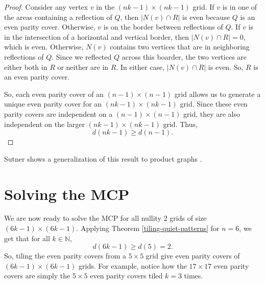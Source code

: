 \documentclass[a4paper]{article}
\newcommand{\N}{\mathbb{N}}
\newcommand{\abs}[1]{\left| #1 \right|}
\begin{document}
\begin{proof}
		Consider any vertex $v$ in the $(nk-1) \times (nk-1)$ grid.
		If $v$ is in one of the areas containing a reflection of $Q$, then $\abs{N(v) \cap R}$ is even because $Q$ is an even parity cover.
		Otherwise, $v$ is on the border between reflections of $Q$.
		If $v$ is in the intersection of a horizontal and vertical border, then $\abs{N(v) \cap R} = 0$, which is even.
		Otherwise, $N(v)$ contains two vertices that are in neighboring reflections of $Q$.
		Since we reflected $Q$ across this boarder, the two vertices are either both in $R$ or neither are in $R$.
		In either case, $\abs{N(v) \cap R}$ is even.
		So, $R$ is an even parity cover.
		
		So, each even parity cover of an $(n-1) \times (n-1)$ grid allows us to generate a unique even parity cover for an $(nk-1) \times (nk-1)$ grid.
		Since these even parity covers are independent on a $(n-1) \times (n-1)$ grid, they are also independent on the larger $(nk-1) \times (nk-1)$ grid.
		Thus,
		\begin{equation*}
			d(nk-1) \geq d(n-1).
		\end{equation*}
	\end{proof}

	Sutner shows a generalization of this result to product graphs \cite{Sutner1988_2}.

	\section{Solving the MCP}
	We are now ready to solve the MCP for all nullity 2 grids of size $(6k-1) \times (6k-1)$.
	Applying Theorem \ref{tiling-quiet-patterns} for $n=6$, we get that for all $k \in \N$,
	\begin{equation*}
		d(6k - 1) \geq d(5) = 2.
	\end{equation*}
	So, tiling the even parity covers from a $5 \times 5$ grid give even parity covers of $(6k-1) \times (6k-1)$ grids.
	For example, notice how the $17 \times 17$ even parity covers are simply the $5 \times 5$ even parity covers tiled $k=3$ times.
	
\end{document}
